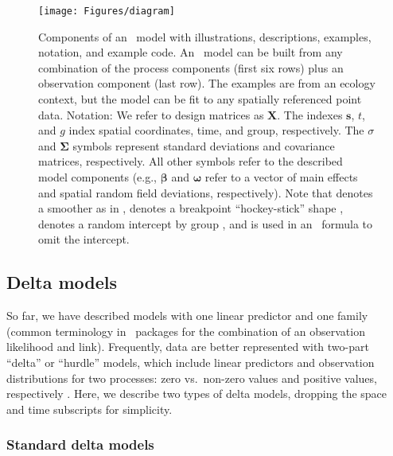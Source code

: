 \documentclass[article]{jss}\usepackage[]{graphicx}\usepackage[dvipsnames]{xcolor}
\newcommand{\sdmTMB}{\pkg{sdmTMB}}
\newcommand{\R}{\proglang{R}}
\begin{document}
\begin{figure}[htbp]
\centering
\texttt{[image: Figures/diagram]}
\caption[]{
Components of an \sdmTMB\ model with illustrations, descriptions, examples, notation, and example code.
An \sdmTMB\ model can be built from any combination of the process components (first six rows) plus an observation component (last row).
The examples are from an ecology context, but the model can be fit to any spatially referenced point data.
Notation: We refer to design matrices as $\bm{X}$.
The indexes $\bm{s}$, $t$, and $g$ index spatial coordinates, time, and group, respectively.
The $\sigma$ and $\bm{\Sigma}$ symbols represent standard deviations and covariance matrices, respectively.
All other symbols refer to the  described model components (e.g., $\bm{\beta}$ and $\bm{\omega}$ refer to a vector of main effects and spatial random field deviations, respectively).
Note that  denotes a smoother as in  \citep{wood2017a},  denotes a breakpoint ``hockey-stick'' shape \citep[e.g.,][]{barrowman2000},  denotes a random intercept by group , and  is used in an \R\ formula to omit the intercept.}\label{fig:diagram}
\end{figure}

\subsection{Delta models}\label{sec:delta}

So far, we have described models with one linear predictor and one family (common terminology in \R\ packages for the combination of an observation likelihood and link).
Frequently, data are better represented with two-part ``delta'' or ``hurdle'' models, which include linear predictors and observation distributions for two processes: zero vs.\ non-zero values and positive values, respectively \citep{aitchison1955}.
Here, we describe two types of delta models, dropping the space and time subscripts for simplicity.

\subsubsection{Standard delta models}
\end{document}
